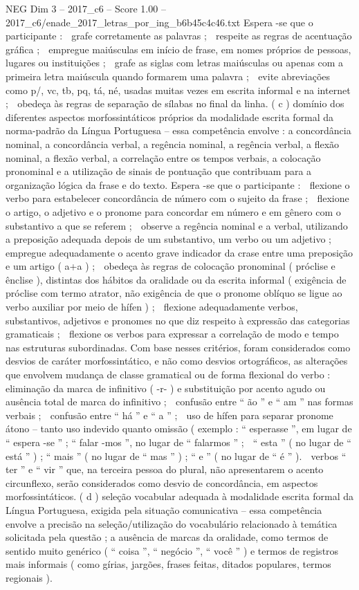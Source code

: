 \begin{textsample}{NEG Dim 3 – 2017\_c6 – Score 1.00 – 2017\_c6/enade\_2017\_letras\_por\_ing\_b6b45c4c46.txt}
Espera -se que o participante :  grafe corretamente as palavras ;  respeite as regras de acentuação gráfica ;  empregue maiúsculas em início de frase, em nomes próprios de pessoas, lugares ou instituições ;  grafe as siglas com letras maiúsculas ou apenas com a primeira letra maiúscula quando formarem uma palavra ;  evite abreviações como p/, vc, tb, pq, tá, né, usadas muitas vezes em escrita informal e na internet ;  obedeça às regras de separação de sílabas no final da linha. ( c ) domínio dos diferentes aspectos morfossintáticos próprios da modalidade escrita formal da norma-padrão da Língua Portuguesa – essa competência envolve : a concordância nominal, a concordância verbal, a regência nominal, a regência verbal, a flexão nominal, a flexão verbal, a correlação entre os tempos verbais, a colocação pronominal e a utilização de sinais de pontuação que contribuam para a organização lógica da frase e do texto.
Espera -se que o participante :  flexione o verbo para estabelecer concordância de número com o sujeito da frase ;  flexione o artigo, o adjetivo e o pronome para concordar em número e em gênero com o substantivo a que se referem ;  observe a regência nominal e a verbal, utilizando a preposição adequada depois de um substantivo, um verbo ou um adjetivo ;  empregue adequadamente o acento grave indicador da crase entre uma preposição e um artigo ( a+a ) ;  obedeça às regras de colocação pronominal ( próclise e ênclise ), distintas dos hábitos da oralidade ou da escrita informal ( exigência de próclise com termo atrator, não exigência de que o pronome oblíquo se ligue ao verbo auxiliar por meio de hífen ) ;  flexione adequadamente verbos, substantivos, adjetivos e pronomes no que diz respeito à expressão das categorias gramaticais ;  flexione os verbos para expressar a correlação de modo e tempo nas estruturas subordinadas.
Com base nesses critérios, foram considerados como desvios de caráter morfossintático, e não como desvios ortográficos, as alterações que envolvem mudança de classe gramatical ou de forma flexional do verbo :  eliminação da marca de infinitivo ( -r- ) e substituição por acento agudo ou ausência total de marca do infinitivo ;  confusão entre “ ão ” e “ am ” nas formas verbais ;  confusão entre “ há ” e “ a ” ;  uso de hífen para separar pronome átono – tanto uso indevido quanto omissão ( exemplo : “ esperasse ”, em lugar de “ espera -se ” ; “ falar -mos ”, no lugar de “ falarmos ” ;  “ esta ” ( no lugar de “ está ” ) ; “ mais ” ( no lugar de “ mas ” ) ; “ e ” ( no lugar de “ é ” ).  verbos “ ter ” e “ vir ” que, na terceira pessoa do plural, não apresentarem o acento circunflexo, serão considerados como desvio de concordância, em aspectos morfossintáticos. ( d ) seleção vocabular adequada à modalidade escrita formal da Língua Portuguesa, exigida pela situação comunicativa – essa competência envolve a precisão na seleção/utilização do vocabulário relacionado à temática solicitada pela questão ; a ausência de marcas da oralidade, como termos de sentido muito genérico ( “ coisa ”, “ negócio ”, “ você ” ) e termos de registros mais informais ( como gírias, jargões, frases feitas, ditados populares, termos regionais ).

\end{textsample}
